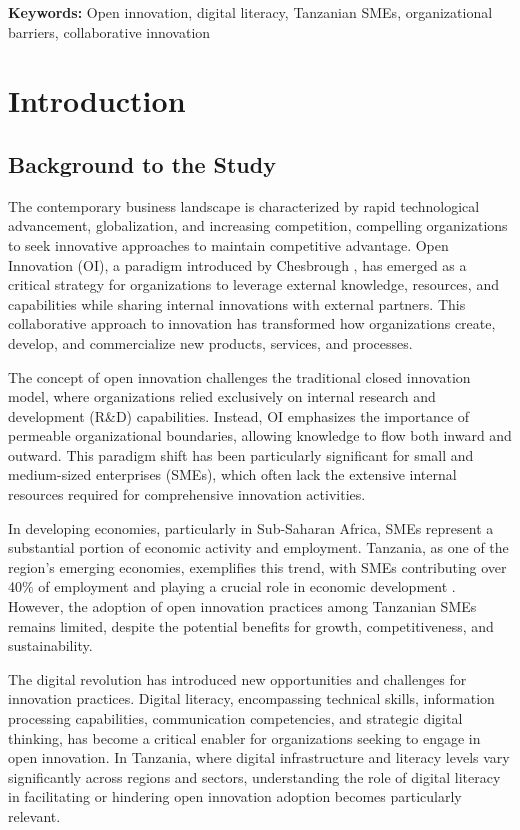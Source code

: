 \documentclass[12pt,a4paper]{article}
\begin{document}
\textbf{Keywords:} Open innovation, digital literacy, Tanzanian SMEs, organizational barriers, collaborative innovation

\newpage
\tableofcontents
\newpage
\listoffigures
\newpage
\listoftables

\chapter{Introduction}

\section{Background to the Study}

The contemporary business landscape is characterized by rapid technological advancement, globalization, and increasing competition, compelling organizations to seek innovative approaches to maintain competitive advantage. Open Innovation (OI), a paradigm introduced by Chesbrough \cite{chesbrough2003open}, has emerged as a critical strategy for organizations to leverage external knowledge, resources, and capabilities while sharing internal innovations with external partners. This collaborative approach to innovation has transformed how organizations create, develop, and commercialize new products, services, and processes.

The concept of open innovation challenges the traditional closed innovation model, where organizations relied exclusively on internal research and development (R&D) capabilities. Instead, OI emphasizes the importance of permeable organizational boundaries, allowing knowledge to flow both inward and outward. This paradigm shift has been particularly significant for small and medium-sized enterprises (SMEs), which often lack the extensive internal resources required for comprehensive innovation activities.

In developing economies, particularly in Sub-Saharan Africa, SMEs represent a substantial portion of economic activity and employment. Tanzania, as one of the region's emerging economies, exemplifies this trend, with SMEs contributing over 40\% of employment and playing a crucial role in economic development \cite{tanzania2019sme}. However, the adoption of open innovation practices among Tanzanian SMEs remains limited, despite the potential benefits for growth, competitiveness, and sustainability.

The digital revolution has introduced new opportunities and challenges for innovation practices. Digital literacy, encompassing technical skills, information processing capabilities, communication competencies, and strategic digital thinking, has become a critical enabler for organizations seeking to engage in open innovation. In Tanzania, where digital infrastructure and literacy levels vary significantly across regions and sectors, understanding the role of digital literacy in facilitating or hindering open innovation adoption becomes particularly relevant.
\end{document}
